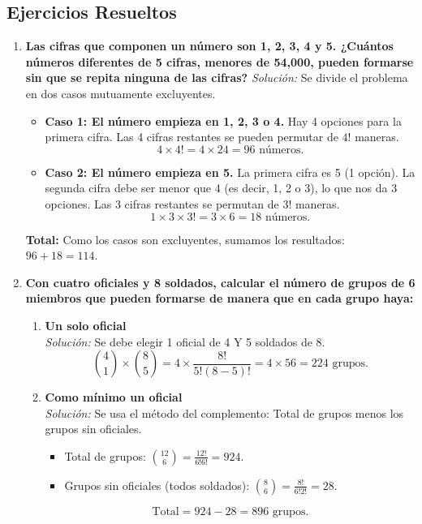 \documentclass[12pt, letterpaper]{article}
\begin{document}
\subsection{Ejercicios Resueltos}
\begin{enumerate}
	\item \textbf{Las cifras que componen un número son 1, 2, 3, 4 y 5. ¿Cuántos números diferentes de 5 cifras, menores de 54,000, pueden formarse sin que se repita ninguna de las cifras?}
	      \textit{Solución:} Se divide el problema en dos casos mutuamente excluyentes.
	      \begin{itemize}
		      \item \textbf{Caso 1: El número empieza en 1, 2, 3 o 4.} Hay 4 opciones para la primera cifra. Las 4 cifras restantes se pueden permutar de $4!$ maneras.
		            \[ 4 \times 4! = 4 \times 24 = 96 \text{ números.} \]
		      \item \textbf{Caso 2: El número empieza en 5.} La primera cifra es 5 (1 opción). La segunda cifra debe ser menor que 4 (es decir, 1, 2 o 3), lo que nos da 3 opciones. Las 3 cifras restantes se permutan de $3!$ maneras.
		            \[ 1 \times 3 \times 3! = 3 \times 6 = 18 \text{ números.} \]
	      \end{itemize}
	      \textbf{Total:} Como los casos son excluyentes, sumamos los resultados: $96 + 18 = 114$.

	\item \textbf{Con cuatro oficiales y 8 soldados, calcular el número de grupos de 6 miembros que pueden formarse de manera que en cada grupo haya:}
	      \begin{enumerate}
		      \item \textbf{Un solo oficial} \\
		            \textit{Solución:} Se debe elegir 1 oficial de 4 Y 5 soldados de 8.
		            \[ \binom{4}{1} \times \binom{8}{5} = 4 \times \frac{8!}{5!(8-5)!} = 4 \times 56 = 224 \text{ grupos.} \]
		      \item \textbf{Como mínimo un oficial} \\
		            \textit{Solución:} Se usa el método del complemento: Total de grupos menos los grupos sin oficiales.
		            \begin{itemize}
			            \item Total de grupos: $\binom{12}{6} = \frac{12!}{6!6!} = 924$.
			            \item Grupos sin oficiales (todos soldados): $\binom{8}{6} = \frac{8!}{6!2!} = 28$.
		            \end{itemize}
		            \[ \text{Total} = 924 - 28 = 896 \text{ grupos.} \]
	      \end{enumerate}


\end{enumerate}
\end{document}
